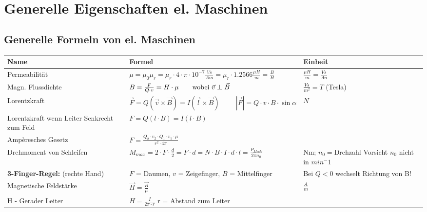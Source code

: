 \section{Generelle Eigenschaften el. Maschinen}
    \subsection{Generelle Formeln von el. Maschinen}
        \renewcommand{\arraystretch}{1.6}
        \begin{tabular}[c]{ | p{5cm} | p{8cm} | p{4cm} | }
            \hline
            \textbf{Name} &
            \textbf{Formel} &
            \textbf{Einheit} \\
            \hline
            Permeabilität &
            $\mu = \mu_0 \mu_r = \mu_r \cdot 4 \cdot \pi \cdot 10^{-7} \frac{Vs}{Am} = \mu_r \cdot 1.2566 \frac{\mu H}{m}=\frac{B}{H}$ &
            $\frac{\mu H}{m}=\frac{Vs}{An}$ \\
            \hline
            Magn. Flussdichte &
            $B = \frac{F}{Q \cdot v} = H \cdot \mu \text{\qquad wobei } \vec{v} \perp \vec{B}$ &
            $\frac{Vs}{m^2} = T$ (Tesla) \\
            \hline
            Lorentzkraft &
            $\vec{F} = Q (\vec{v} \times \vec{B})=I(\vec{l}\times \vec{B}) \hspace{1cm} |\vec{F}| = Q \cdot v \cdot B \cdot \sin\alpha$ &
            $N$ \\
            Lorentzkraft wenn Leiter Senkrecht zum Feld & $ F = Q(l \cdot B) = I(l \cdot B) $& \\
            Ampèresches Gesetz &
            $F=\frac{Q_2 \cdot v_2 \cdot Q_1 \cdot v_1 \cdot \mu}{r^2 \cdot 4\pi}$ &
            \\
            \hline
            Drehmoment von Schleifen &
            $M_{max} = 2 \cdot F \cdot \frac{d}{2}= F \cdot d = N \cdot B \cdot I \cdot d \cdot l = \frac{P_{Mech}}{2 \pi n_0} $ &
            Nm; $n_0= $Drehzahl Vorsicht $n_0$ nicht in $min^-1$ \\
            \hline
            \textbf{3-Finger-Regel:} (rechte Hand) &
            $F$ = Daumen, $v$ = Zeigefinger, $B$ = Mittelfinger &
            Bei $Q < 0$ wechselt Richtung von B! \\
            \hline
            Magnetische Feldstärke & 
            $\vec{H} = \frac{ \vec{B}}{\mu }$   &
            $\frac{A}{m}$ \\
            H - Gerader Leiter & $ H = \frac{I}{2 \pi \cdot r}$ \qquad r = Abstand zum Leiter& \\ 

\end{tabular}
